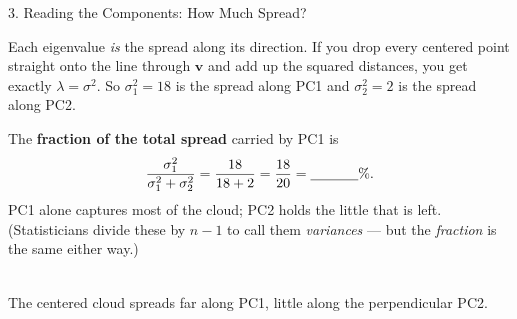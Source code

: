 \documentclass[10pt]{article}
\newcommand{\vv}{\mathbf{v}}
\begin{document}
\begin{notesbox}{3. Reading the Components: How Much Spread?}
\begin{minipage}[t]{0.56\linewidth}\vspace{0pt}
Each eigenvalue \emph{is} the spread along its direction. If you drop every centered point straight onto the
line through $\vv$ and add up the squared distances, you get exactly $\lambda=\sigma^2$. So
$\sigma_1^2=18$ is the spread along PC1 and $\sigma_2^2=2$ is the spread along PC2.

\vspace{3pt}
The \textbf{fraction of the total spread} carried by PC1 is
\[
  \frac{\sigma_1^2}{\sigma_1^2+\sigma_2^2}=\frac{18}{18+2}=\frac{18}{20}=\blank{1.2cm}\%.
\]
PC1 alone captures most of the cloud; PC2 holds the little that is left. (Statisticians divide these by
$n-1$ to call them \emph{variances} --- but the \emph{fraction} is the same either way.)
\end{minipage}\hfill
\begin{minipage}[t]{0.40\linewidth}\vspace{0pt}
\centering
{}\\[-1pt]
{\scriptsize The centered cloud spreads far along PC1, little along the perpendicular PC2.}
\end{minipage}
\end{notesbox}
\end{document}
